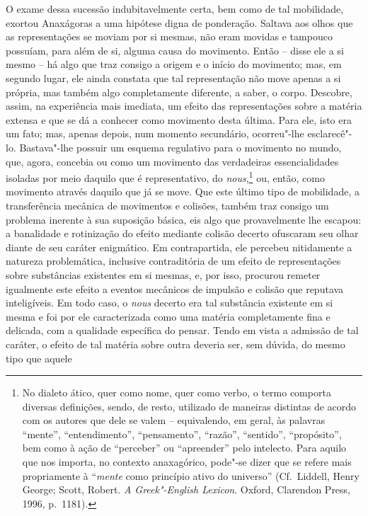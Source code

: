 O exame dessa sucessão indubitavelmente certa, bem como de tal
mobilidade, exortou Anaxágoras a uma hipótese digna de ponderação.
Saltava aos olhos que as representações se moviam por si mesmas, não
eram movidas e tampouco possuíam, para além de si, alguma causa do
movimento. Então -- disse ele a si mesmo -- há algo que traz consigo a
origem e o início do movimento; mas, em segundo lugar, ele ainda \label{aorigemeoinicio}
constata que tal representação não move apenas a si própria, mas \label{asipropria}
também algo completamente diferente, a saber, o corpo. Descobre, assim,
na experiência mais imediata, um efeito das representações sobre a
matéria extensa e que se dá a conhecer como movimento desta última.
Para ele, isto era um fato; mas, apenas depois, num momento secundário,
ocorreu"-lhe esclarecê"-lo. Bastava"-lhe possuir um esquema regulativo
para o movimento no mundo, que, agora, concebia ou como um movimento
das verdadeiras essencialidades isoladas por meio daquilo que é
representativo, do \textit{nous},\footnote{ No dialeto ático, quer como
nome, quer como verbo, o termo comporta diversas definições, sendo, de resto, 
utilizado de maneiras distintas de acordo com os autores que dele se valem -- equivalendo, em
geral, às palavras ``mente'', ``entendimento'', ``pensamento'', ``razão'',
``sentido'', ``propósito'', bem como à ação de ``perceber'' ou ``apreender''
pelo intelecto. Para aquilo que nos importa, no contexto anaxagórico,
pode"-se dizer que se refere mais propriamente
à ``\textit{mente} como princípio ativo do universo'' (Cf.~Liddell, Henry
George; Scott, Robert. \textit{A Greek"-English Lexicon}. Oxford,
Clarendon Press, 1996, p.~1181).} ou, então, como movimento
através daquilo que já se move. Que este último tipo de mobilidade, a
transferência mecânica de movimentos e colisões, também traz consigo um
problema inerente à sua suposição básica, eis algo que provavelmente
lhe escapou: a banalidade e rotinização do efeito mediante colisão
decerto ofuscaram seu olhar diante de seu caráter enigmático. Em
contrapartida, ele percebeu nitidamente a natureza problemática,
inclusive contraditória de um efeito de representações sobre
substâncias existentes em si mesmas, e, por isso, procurou remeter
igualmente este efeito a eventos mecânicos de impulsão e colisão que
reputava inteligíveis. Em todo caso, o \textit{nous} decerto era tal
substância existente em si mesma e foi por ele caracterizada como uma
matéria completamente fina e delicada, com a qualidade específica do
pensar. Tendo em vista a admissão de tal caráter, o efeito de tal
matéria sobre outra deveria ser, sem dúvida, do mesmo tipo que aquele
